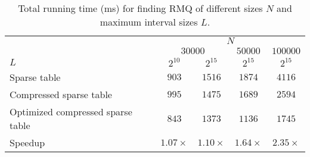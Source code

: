 \begin{table}[!thb]
  \caption{Total running time (ms) for finding RMQ of different sizes $N$ and maximum interval sizes $L$.}
  \label{tlb:CORMQ}
  \begin{minipage}{\columnwidth}
  \begin{center}
  \begin{tabular}{l c c c c}
    \toprule
      & \multicolumn{4}{c}{$N$} \\
      \cline{2-5}
        & \multicolumn{2}{c}{$30000$} & $50000$ & $100000$ \\
      $L$ & $2^{10}$ & $2^{15}$ & $2^{15}$ & $2^{15}$ \\
      \hline
      Sparse table     & $903$ & $1516$ & $1874$ & $4116$ \\
      Compressed sparse table & $995$ & $1475$ & $1689$ & $2594$ \\
      Optimized compressed sparse table & $843$ & $1373$ & $1136$ & $1745$ \\
      \hline
      Speedup & $1.07\times$ & $1.10\times$ & $1.64\times$ & $2.35\times$\\
    \bottomrule
  \end{tabular}
  \end{center}
  \end{minipage}
\end{table}